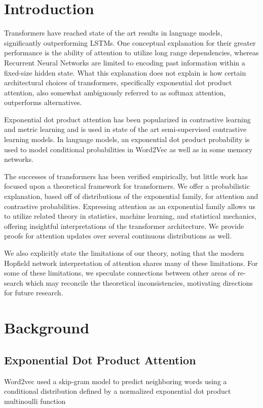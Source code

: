 \documentclass{article}
\begin{document}
\section{Introduction}
\label{introduction}

Transformers have reached state of the art results in language models, significantly outperforming LSTMs. One conceptual explanation for their greater performance is the ability of attention to utilize long range dependencies, whereas Recurrent Neural Networks are limited to encoding past information within a fixed-size hidden state. 
What this explanation does not explain is how certain architectural choices of transformers, specifically exponential dot product attention, also somewhat ambiguously referred to as softmax attention, outperforms alternatives.

Exponential dot product attention has been popularized in contrastive learning and metric learning and is used in state of the art semi-supervised contrastive learning models.
In language models, an exponential dot product probability is used to model conditional probabilities in Word2Vec as well as in some memory networks. 

The successes of transformers has been verified empirically, but little work
has focused upon a theoretical framework for transformers. 
We offer a probabilistic explanation, based off of distributions of the exponential
family, for attention and contrastive probabilities. 
Expressing attention as an exponential family allows us to utilize related theory in statistics, machine learning, and statistical mechanics, offering insightful interpretations of the transformer architecture. We provide proofs for attention updates over several continuous distributions as well.

We also explicitly state the limitations of our theory, noting that the modern
Hopfield network interpretation of attention shares many of these limitations. For
some of these limitations, we speculate connections between other areas of re-
search which may reconcile the theoretical inconsistencies, motivating directions
for future research.

\section{Background}
\label{background}

\subsection{Exponential Dot Product Attention}
Word2vec used a skip-gram model to predict neighboring words using a conditional distribution defined by a normalized exponential dot product multinoulli function \cite{DBLP:journals/corr/MikolovSCCD13}
\end{document}
